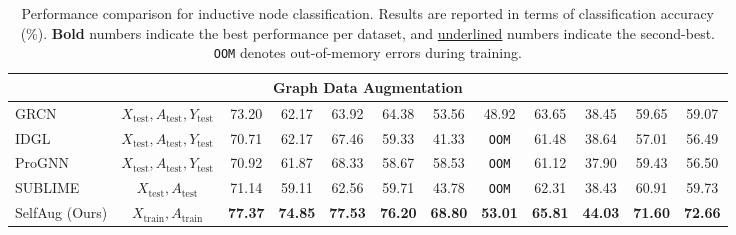 \documentclass[letterpaper]{article} \usepackage{aaai2026}  \usepackage{times}  \usepackage{helvet}  \usepackage{courier}  \usepackage[hyphens]{url}  \usepackage{graphicx} \urlstyle{rm} \def\UrlFont{\rm}  \usepackage{natbib}  \usepackage{caption} \frenchspacing  \setlength{\pdfpagewidth}{8.5in}  \setlength{\pdfpageheight}{11in}
\begin{document}
\begin{table}[t]
{\begin{tabular}{l c c c c c c c c c c c}
\midrule
\multicolumn{12}{c}{\textbf{Graph Data Augmentation}} \\
\midrule
GRCN & $X_\text{test}, A_\text{test}, Y_\text{test}$ & 73.20 & 62.17 & 63.92 & 64.38 & 53.56 & 48.92 & 63.65 & 38.45 & 59.65 & 59.07 \\
IDGL & $X_\text{test}, A_\text{test}, Y_\text{test}$ & 70.71 & 62.17 & 67.46 & 59.33 & 41.33 & \texttt{OOM} & 61.48 & 38.64 & 57.01 & 56.49 \\
ProGNN & $X_\text{test}, A_\text{test}, Y_\text{test}$ & 70.92 & 61.87 & 68.33 & 58.67 & 58.53 & \texttt{OOM} & 61.12 & 37.90 & 59.43 & 56.50 \\
SUBLIME & $X_\text{test}, A_\text{test}$ & 71.14 & 59.11 & 62.56 & 59.71 & 43.78 & \texttt{OOM} & 62.31 & 38.43 & 60.91 & 59.73 \\
\midrule
SelfAug (Ours) & $X_\text{train}, A_\text{train}$
& \textbf{77.37}
& \textbf{74.85}
& \textbf{77.53}
& \textbf{76.20}
& \textbf{68.80}
& \textbf{53.01}
& \textbf{65.81}
& \textbf{44.03}
& \textbf{71.60}
& \textbf{72.66} \\
\bottomrule
\end{tabular}}
\caption{Performance comparison for inductive node classification. Results are reported in terms of classification accuracy (\%). \textbf{Bold} numbers indicate the best performance per dataset, and \underline{underlined} numbers indicate the second-best. \texttt{OOM} denotes out-of-memory errors during training.}
\label{tab:performance_comparison_inductive}
\end{table}
\end{document}
